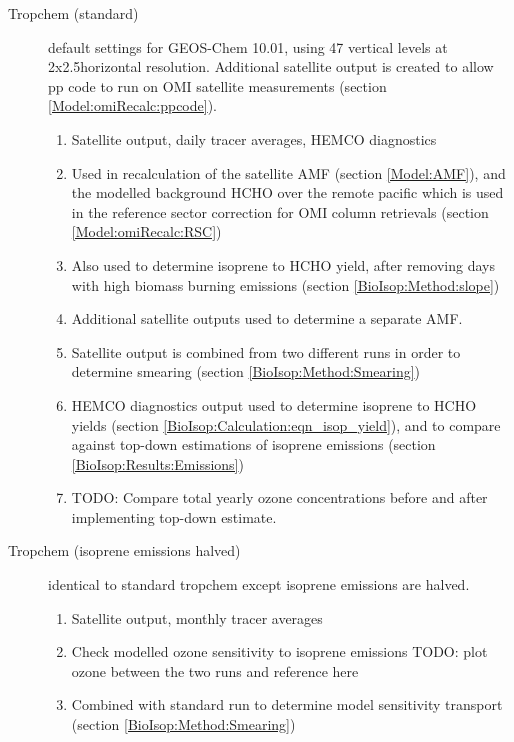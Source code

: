 \begin{description}
        \item [Tropchem (standard)]%
          default settings for GEOS-Chem 10.01, using 47 vertical levels at 2x2.5\degr horizontal resolution.
          Additional satellite output is created to allow pp code to run on OMI satellite measurements (section \ref{Model:omiRecalc:ppcode}).
        \begin{enumerate}
          \item Satellite output, daily tracer averages, HEMCO diagnostics
          \item Used in recalculation of the satellite AMF (section \ref{Model:AMF}), and the modelled background HCHO over the remote pacific which is used in the reference sector correction for OMI column retrievals (section \ref{Model:omiRecalc:RSC})
          \item Also used to determine isoprene to HCHO yield, after removing days with high biomass burning emissions (section \ref{BioIsop:Method:slope})
          \item Additional satellite outputs used to determine a separate AMF.
          \item Satellite output is combined from two different runs in order to determine smearing (section \ref{BioIsop:Method:Smearing})
          \item HEMCO diagnostics output used to determine isoprene to HCHO yields (section \ref{BioIsop:Calculation:eqn_isop_yield}), and to compare against top-down estimations of isoprene emissions (section \ref{BioIsop:Results:Emissions})
          \item TODO: Compare total yearly ozone concentrations before and after implementing top-down estimate.
        \end{enumerate}
        
        \item [Tropchem (isoprene emissions halved)]%
          identical to standard tropchem except isoprene emissions are halved.
        \begin{enumerate}
          \item Satellite output, monthly tracer averages 
          \item Check modelled ozone sensitivity to isoprene emissions TODO: plot ozone between the two runs and reference here
          \item Combined with standard run to determine model sensitivity transport (section \ref{BioIsop:Method:Smearing})
        \end{enumerate}
        

\end{description}
